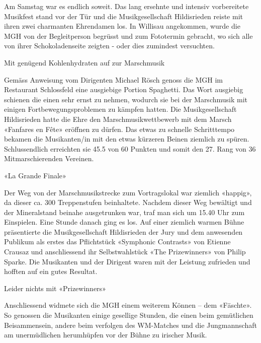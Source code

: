\begin{history}
\begin{itemize}
                  Am Samstag  war es endlich soweit. Das lang ersehnte und intensiv
                  vorbereitete Musikfest stand vor der Tür und die Musikgesellschaft
                  Hildisrieden reiste mit ihren zwei charmanten Ehrendamen los. In
                  Willisau angekommen, wurde die MGH von der Begleitperson begrüsst und
                  zum Fototermin gebracht, wo sich alle von ihrer Schokoladenseite zeigten
                  - oder dies zumindest versuchten.

                  Mit genügend Kohlenhydraten auf zur Marschmusik

                  Gemäss Anweisung vom Dirigenten Michael Rösch genoss die MGH im
                  Restaurant Schlossfeld eine ausgiebige Portion Spaghetti. Das Wort
                  ausgiebig schienen die einen sehr ernst zu nehmen, wodurch sie bei der
                  Marschmusik mit einigen Fortbewegungsproblemen zu kämpfen hatten. Die
                  Musikgesellschaft Hildisrieden hatte die Ehre den Marschmusikwettbewerb
                  mit dem Marsch «Fanfares en Fête» eröffnen zu dürfen. Das etwas zu
                  schnelle Schritttempo bekamen die Musikanten/in mit den etwas kürzeren
                  Beinen ziemlich zu spüren. Schlussendlich  erreichten sie 45.5 von 60
                  Punkten und somit den 27. Rang von 36 Mitmarschierenden Vereinen.

                  «La Grande Finale»

                  Der Weg von der Marschmusikstrecke zum Vortragslokal war ziemlich
                  «happig», da dieser ca. 300 Treppenstufen beinhaltete. Nachdem dieser
                  Weg bewältigt und der Mineralstand beinahe ausgetrunken war, traf man
                  sich um 15.40 Uhr zum Einspielen. Eine Stunde danach ging es los. Auf
                  einer ziemlich warmen Bühne präsentierte die Musikgesellschaft
                  Hildisrieden der Jury und dem anwesenden Publikum als erstes das
                  Pflichtstück «Symphonic Contrasts» von Etienne Crausaz und anschliessend
                  ihr Selbstwahlstück «The Prizewinners» von Philip Sparke. Die Musikanten
                  und der Dirigent waren mit der Leistung zufrieden und hofften auf ein
                  gutes Resultat.

                  Leider nichts mit «Prizewinners»

                  Anschliessend widmete sich die MGH einem weiterem Können – dem
                  «Fäschte». So genossen die Musikanten einige gesellige Stunden, die
                  einen beim gemütlichen Beisammensein, andere beim verfolgen des
                  WM-Matches und die Jungmannschaft am unermüdlichen herumhüpfen vor der
                  Bühne zu irischer Musik.


\end{itemize}
\end{history}
